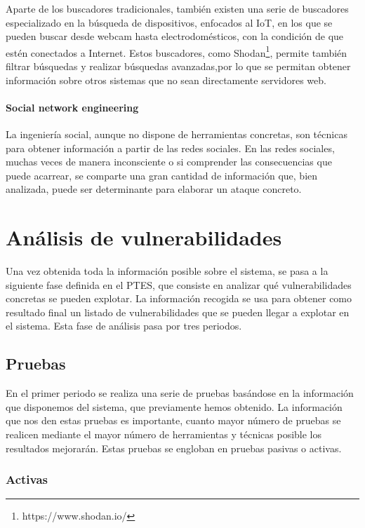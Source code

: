 Aparte de los buscadores tradicionales, también existen una serie de buscadores especializado en la búsqueda de dispositivos, enfocados al IoT, en los que se pueden buscar desde webcam hasta electrodomésticos, con la condición de que estén conectados a Internet. Estos buscadores, como Shodan\footnote{https://www.shodan.io/}, permite también filtrar búsquedas y realizar búsquedas avanzadas,por lo que se permitan obtener información sobre otros sistemas que no sean directamente servidores web.

\paragraph{Social network engineering}

La ingeniería social, aunque no dispone de herramientas concretas, son técnicas para obtener información a partir de las redes sociales. En las redes sociales, muchas veces de manera inconsciente o si comprender las consecuencias que puede acarrear, se comparte una gran cantidad de información que, bien analizada, puede ser determinante para elaborar un ataque concreto.

\section{Análisis de vulnerabilidades}

Una vez obtenida toda la información posible sobre el sistema, se pasa a la siguiente fase definida en el PTES, que consiste en analizar qué vulnerabilidades concretas se pueden explotar. La información recogida se usa para obtener como resultado final un listado de vulnerabilidades que se pueden llegar a explotar en el sistema. Esta fase de análisis pasa por tres periodos.

\subsection{Pruebas}

En el primer periodo se realiza una serie de pruebas basándose en la información que disponemos del sistema, que previamente hemos obtenido. La información que nos den estas pruebas es importante, cuanto mayor número de pruebas se realicen mediante el mayor número de herramientas y técnicas posible los resultados mejorarán. Estas pruebas se engloban en pruebas pasivas o activas.

\subsubsection{Activas}

